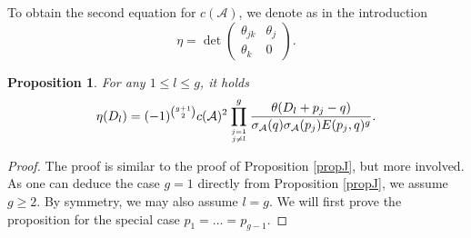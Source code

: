\documentclass[10pt,a4paper]{amsart}
\numberwithin{equation}{section}
\newtheorem{Proposition}[Theorem]{Proposition}
 { \theoremstyle{definition}
\newtheorem{Definition}[Theorem]{Definition}
\newtheorem{Note}[Theorem]{Note}
\newtheorem{Example}[Theorem]{Example}
\newtheorem{Remark}[Theorem]{Remark} }
\newcommand\gf[2]{\genfrac{}{}{0pt}{}{#1}{#2}}
\begin{document}
To obtain the second equation for $c(\mathcal{A})$, we denote as in the introduction
\[\eta=\det\begin{pmatrix}\theta_{jk}&\theta_j\\ \theta_k &0 \end{pmatrix}.\]
\begin{Proposition}\label{propeta} For any $1\le l\le g$, it holds
	\[\eta(D_l)=(-1)^{\binom{g+1}{2}}c(\mathcal{A})^2\prod_{\gf{j=1}{j\neq l}}^{g}\frac{\theta(D_l+p_j-q)}{\sigma_{\mathcal{A}}(q)\sigma_{\mathcal{A}}(p_j)E(p_j,q)^g}.\]
\end{Proposition}
\begin{proof}
	The proof is similar to the proof of Proposition \ref{propJ}, but more involved. As one can deduce the case $g=1$ directly from Proposition \ref{propJ}, we assume $g\ge 2$.
	By symmetry, we may also assume $l=g$.
	We will first prove the proposition for the special case $p_1=\dots=p_{g-1}$.
	

\end{proof}
\end{document}
